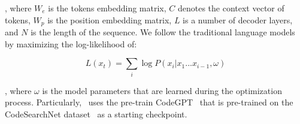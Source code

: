 \noindent, where $W_e$ is the tokens embedding matrix, $C$ denotes the context vector of tokens, $W_p$ is the position embedding matrix, $L$ is a number of decoder layers, and $N$ is the length of the sequence.
We follow the traditional language models by maximizing the log-likelihood of:

\begin{equation}
    \label{eq:log-likelihood}
    L(x_t) = \sum_i{\log P(x_i|x_1...x_{i-1}, \omega)}
\end{equation}

\noindent, where $\omega$ is the model parameters that are learned during the optimization process.
Particularly, \our~uses the pre-train CodeGPT~\cite{lu2021codexglue} that is pre-trained on the CodeSearchNet dataset~\cite{husain2019codesearchnet} as a starting checkpoint.










